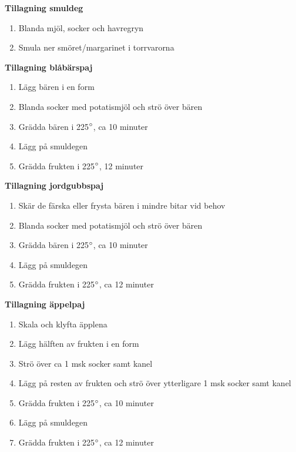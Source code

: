 \begin{multicols*}{2}

\noindent \textbf{Tillagning smuldeg}
\begin{enumerate}
	\itemsep0cm
	\item Blanda mjöl, socker och havregryn
	\item Smula ner smöret/margarinet i torrvarorna	
\end{enumerate}

\noindent \textbf{Tillagning blåbärspaj}
\begin{enumerate}
	\itemsep0cm
	\item Lägg bären i en form
	\item Blanda socker med potatismjöl och strö över bären
	\item Grädda bären i 225$\degree$, ca 10 \mbox{minuter}
	\item Lägg på smuldegen
	\item Grädda frukten i 225$\degree$, 12 \mbox{minuter}
\end{enumerate}
\vfill
\columnbreak

\noindent \textbf{Tillagning jordgubbspaj}
\begin{enumerate}
	\itemsep0cm
	\item Skär de färska eller frysta bären i mindre bitar vid behov
	\item Blanda socker med potatismjöl och strö över bären
	\item Grädda bären i 225$\degree$, ca 10 \mbox{minuter}
	\item Lägg på smuldegen
	\item Grädda frukten i 225$\degree$, ca 12 \mbox{minuter}
\end{enumerate}

\noindent \textbf{Tillagning äppelpaj}
\begin{enumerate}
	\itemsep0cm
	\item Skala och klyfta äpplena
	\item Lägg hälften av frukten i en form
	\item Strö över ca 1 msk socker samt kanel
	\item Lägg på resten av frukten och strö över ytterligare 1 msk socker samt kanel
	\item Grädda frukten i 225$\degree$, ca 10 \mbox{minuter}
	\item Lägg på smuldegen
	\item Grädda frukten i 225$\degree$, ca 12 \mbox{minuter}
\end{enumerate}

\end{multicols*}

